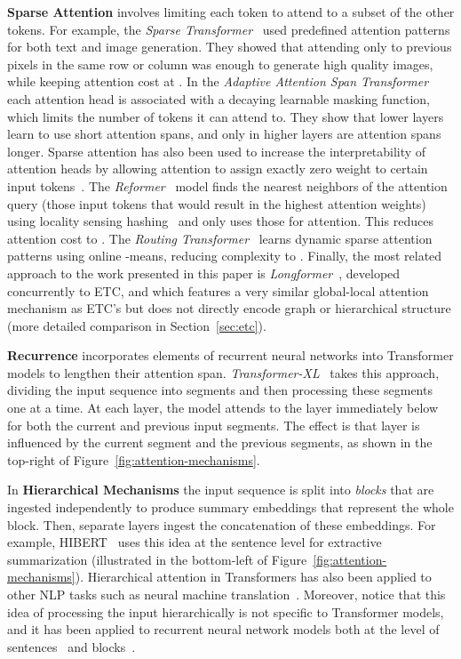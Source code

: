 \documentclass[11pt,a4paper]{article}
\begin{document}
{\bf Sparse Attention} involves limiting each token to attend to a subset of the other tokens. For example, the {\em Sparse Transformer}~\cite{child2019generating} used predefined attention patterns for both text and image generation. They showed that attending only to previous pixels in the same row or column was enough to generate high quality images, while keeping attention cost at . In the {\em Adaptive Attention Span Transformer}~\cite{sukhbaatar2019adaptive} each attention head is associated with a decaying learnable masking function, which limits the number of tokens it can attend to. They show that lower layers learn to use short attention spans, and only in higher layers are attention spans longer. Sparse attention has also been used to increase the interpretability of attention heads by allowing attention to assign exactly zero weight to certain input tokens~\cite{correia2019adaptively}. The {\em Reformer}~\cite{kitaev2020reformer} model finds the nearest neighbors of the attention query (those input tokens that would result in the highest attention weights) using locality sensing hashing~\cite{andoni2015practical} and only uses those for attention. This reduces attention cost to . The {\em Routing Transformer}~\cite{roy2020efficient} learns dynamic sparse attention patterns using online -means, reducing complexity to . Finally, the most related approach to the work presented in this paper is {\em Longformer}~\cite{beltagy2020longformer}, developed concurrently to ETC, and which features a very similar global-local attention mechanism as ETC's but does not directly encode graph or hierarchical structure (more detailed comparison in Section~\ref{sec:etc}).


{\bf Recurrence} incorporates elements of recurrent neural networks into Transformer models to lengthen their attention span. {\em Transformer-XL}~\cite{dai2019transformer} takes this approach, dividing the input sequence into segments and then processing these segments one at a time. At each layer, the model attends to the layer immediately below for both the current and previous input segments. The effect is that layer  is influenced by the current segment and the  previous segments, as shown in the top-right of Figure~\ref{fig:attention-mechanisms}.


In {\bf Hierarchical Mechanisms} the input sequence is split into {\em blocks} that are ingested independently to produce summary embeddings that represent the whole block. Then, separate layers ingest the concatenation of these embeddings. For example, HIBERT~\cite{zhang2019hibert} uses this idea at the sentence level for extractive summarization (illustrated in the bottom-left of Figure~\ref{fig:attention-mechanisms}). Hierarchical attention in Transformers has also been applied to other NLP tasks such as neural machine translation~\cite{maruf2019selective}. Moreover, notice that this idea of processing the input hierarchically is not specific to Transformer models, and it has been applied to recurrent neural network models both at the level of sentences~\cite{yang2016hierarchical,miculicich2018document} and blocks~\cite{shen2018bi}. 
\end{document}
